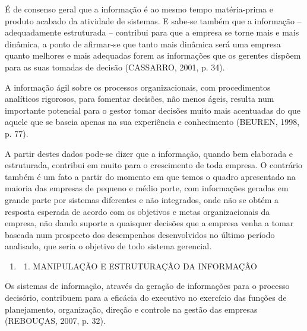 \documentclass[a4paper]{article}
\newcounter{saveenum}
\newcommand\liststyleWWviiiNumi{%
\renewcommand\theenumi{\arabic{enumi}}
\renewcommand\theenumii{\arabic{enumi}.\arabic{enumii}}
\renewcommand\theenumiii{\arabic{enumi}.\arabic{enumii}.\arabic{enumiii}}
\renewcommand\theenumiv{\arabic{enumi}.\arabic{enumii}.\arabic{enumiii}.\arabic{enumiv}}
\renewcommand\labelenumi{\theenumi}
\renewcommand\labelenumii{\theenumii}
\renewcommand\labelenumiii{\theenumiii}
\renewcommand\labelenumiv{\theenumiv.}
}
\begin{document}
{
\textsf{\'E de consenso geral que a informa\c{c}\~ao \'e ao mesmo tempo mat\'eria-prima e produto acabado da atividade
de sistemas. E sabe-se tamb\'em que a informa\c{c}\~ao -- adequadamente estruturada -- contribui para que a empresa se
torne mais e mais din\^amica, a ponto de afirmar-se que tanto mais din\^amica ser\'a uma empresa quanto melhores e mais
adequadas forem as informa\c{c}\~oes que os gerentes disp\~oem para as suas tomadas de decis\~ao (CASSARRO, 2001, p.
34). }}

{\sffamily
A informa\c{c}\~ao \'agil sobre os processos organizacionais, com procedimentos anal\'iticos rigorosos, para fomentar
decis\~oes, n\~ao menos \'ageis, resulta num importante potencial para o gestor tomar decis\~oes muito mais acentuadas
do que aquele que se baseia apenas na sua experi\^encia e conhecimento (BEUREN, 1998, p. 77).}

{\sffamily
A partir destes dados pode-se dizer que a informa\c{c}\~ao, quando bem elaborada e estruturada, contribui em muito para
o crescimento de toda empresa. O contr\'ario tamb\'em \'e um fato a partir do momento em que temos o quadro apresentado
na maioria das empresas de pequeno e m\'edio porte, com informa\c{c}\~oes geradas em grande parte por sistemas
diferentes e n\~ao integrados, onde n\~ao se obt\'em a resposta esperada de acordo com os objetivos e metas
organizacionais da empresa, n\~ao dando suporte a quaisquer decis\~oes que a empresa venha a tomar baseada num
prospecto dos desempenhos desenvolvidos no \'ultimo per\'iodo analisado, que seria o objetivo de todo sistema
gerencial. }


\bigskip

\liststyleWWviiiNumi
\setcounter{saveenum}{\value{enumi}}
\begin{enumerate}
\setcounter{enumi}{\value{saveenum}}
\item \setcounter{saveenum}{\value{enumii}}
\begin{enumerate}
\setcounter{enumii}{\value{saveenum}}
\item {\sffamily
MANIPULA\c{C}\~AO E ESTRUTURA\c{C}\~AO DA INFORMA\c{C}\~AO}
\end{enumerate}
\end{enumerate}
{\sffamily
Os sistemas de informa\c{c}\~ao, atrav\'es da gera\c{c}\~ao de informa\c{c}\~oes para o processo decis\'orio, contribuem
para a efic\'acia do executivo no exerc\'icio das fun\c{c}\~oes de planejamento, organiza\c{c}\~ao, dire\c{c}\~ao e
controle na gest\~ao das empresas (REBOU\c{C}AS, 2007, p. 32). }
\end{document}
